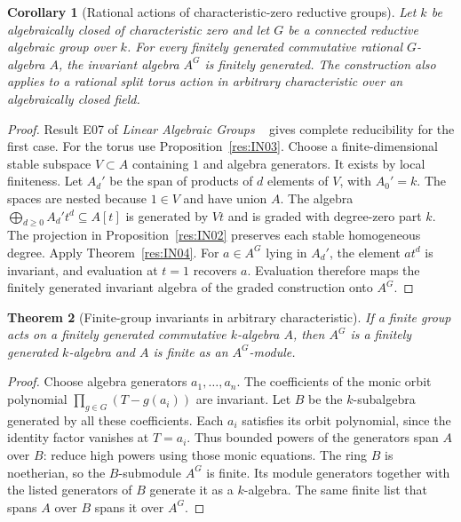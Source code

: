 \documentclass[11pt,oneside,openany]{book}
\newtheorem{theorem}{Theorem}[chapter]
\newtheorem{corollary}[theorem]{Corollary}
\theoremstyle{definition}
\theoremstyle{remark}
\begin{document}
\begin{corollary}[Rational actions of characteristic-zero reductive groups]
\label{res:IN05}
Let \(k\) be algebraically closed of characteristic zero and
let \(G\) be a connected reductive algebraic group over \(k\).
For every finitely generated commutative rational \(G\)-algebra
\(A\), the invariant algebra \(A^G\) is finitely generated.
The construction also applies to a rational split torus
action in arbitrary characteristic over an algebraically
closed field.
\end{corollary}
\begin{proof}
Result E07 of \emph{Linear Algebraic Groups}
~\cite[PDF p.~40]{mg-alggroup} gives complete reducibility for
the first case. For the torus use Proposition~\ref{res:IN03}.
Choose a finite-dimensional stable subspace \(V\subset A\)
containing \(1\) and algebra generators. It exists by local
finiteness. Let \(A_d'\) be the span of products of \(d\)
elements of \(V\), with \(A_0'=k\). The spaces are nested
because \(1\in V\) and have union \(A\).
The algebra \(\bigoplus_{d\ge0}A_d' t^d\subseteq A[t]\)
is generated by \(Vt\) and is graded with degree-zero part \(k\).
The projection in Proposition~\ref{res:IN02} preserves each
stable homogeneous degree. Apply Theorem~\ref{res:IN04}.
For \(a\in A^G\) lying in \(A_d'\), the element \(at^d\) is
invariant, and evaluation at \(t=1\) recovers \(a\).
Evaluation therefore maps the finitely generated invariant
algebra of the graded construction onto \(A^G\).
\end{proof}

\begin{theorem}[Finite-group invariants in arbitrary characteristic]
\label{res:IN06}
If a finite group acts on a finitely generated commutative
\(k\)-algebra \(A\), then \(A^G\) is a finitely generated
\(k\)-algebra and \(A\) is finite as an \(A^G\)-module.
\end{theorem}
\begin{proof}
Choose algebra generators \(a_1,\ldots,a_n\). The coefficients
of the monic orbit polynomial
\(\prod_{g\in G}(T-g(a_i))\) are invariant. Let \(B\) be the
\(k\)-subalgebra generated by all these coefficients.
Each \(a_i\) satisfies its orbit polynomial, since the identity
factor vanishes at \(T=a_i\). Thus bounded powers of the
generators span \(A\) over \(B\): reduce high powers using those
monic equations. The ring \(B\) is noetherian, so the
\(B\)-submodule \(A^G\) is finite. Its module generators
together with the listed generators of \(B\) generate it as
a \(k\)-algebra. The same finite list that spans \(A\) over
\(B\) spans it over \(A^G\).
\end{proof}
\end{document}
